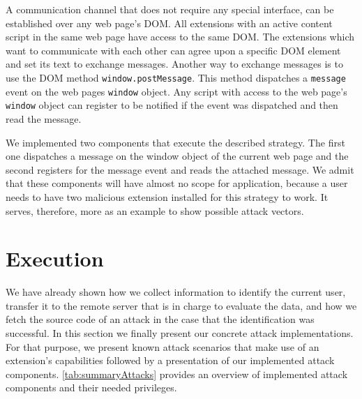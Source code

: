 	A communication channel that does not require any special interface, can be established over any web page's DOM. All extensions with an active content script in the same web page have access to the same DOM. The extensions which want to communicate with each other can agree upon a specific DOM element and set its text to exchange messages. Another way to exchange messages is to use the DOM method \texttt{window.postMessage}. This method dispatches a \texttt{message} event on the web pages \texttt{window} object. Any script with access to the web page's \texttt{window} object can register to be notified if the event was dispatched and then read the message. 
	
	We implemented two components that execute the described strategy. The first one dispatches a message on the window object of the current web page and the second registers for the message event and reads the attached message. We admit that these components will have almost no scope for application, because a user needs to have two malicious extension installed for this strategy to work. It serves, therefore, more as an example to show possible attack vectors.


\clearpage
\section{Execution}
\label{sec:execution}

	We have already shown how we collect information to identify the current user, transfer it to the remote server that is in charge to evaluate the data, and how we fetch the source code of an attack in the case that the identification was successful. In this section we finally present our concrete attack implementations. For that purpose, we present known attack scenarios that make use of an extension's capabilities followed by a presentation of our implemented attack components. \autoref{tab:summaryAttacks} provides an overview of implemented attack components and their needed privileges.
	
